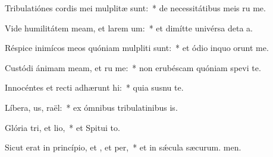 \item Tribulatiónes cordis mei mulplitæ sunt:~* de necessitátibus meis ru me.
\item Vide humilitátem meam, et larem um:~* et dimítte univérsa deta a.
\item Réspice inimícos meos quóniam mulpliti sunt:~* et ódio inquo orunt me.
\item Custódi ánimam meam, et ru me:~* non erubéscam quóniam spevi  te.
\item Innocéntes et recti adhærunt hi:~* quia susnu te.
\item Líbera, us, raël:~* ex ómnibus tribulatinibus is.
\item Glória tri, et lio,~* et Spitui to.
\item Sicut erat in princípio, et , et per,~* et in sǽcula sæcurum. men.
